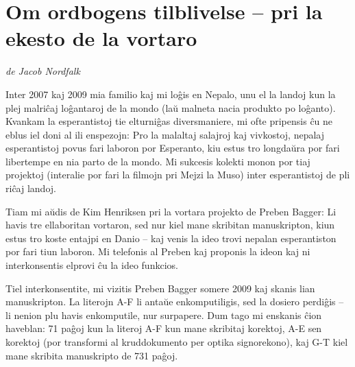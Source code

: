 \setlength{\textheight}{7.0in}
\setlength{\parskip}{1.5ex plus 0.2ex minus 0.2ex}
\setlength{\parindent}{0cm}
\titlespacing{\section}{0pt}{10pt}{0pt}

\pagestyle{empty}

\mbox{}

\newpage

\pagestyle{plain}

\section{Om ordbogens tilblivelse -- pri la ekesto de la vortaro}
{\itshape
de Jacob Nordfalk}

{\frenchspacing
Inter 2007 kaj 2009 mia familio kaj mi lo\^gis en Nepalo, unu el la
landoj kun la plej malri\^caj lo\^gantaroj de la mondo (la\u{u} malneta
nacia produkto po lo\^ganto). Kvankam la esperantistoj tie elturni\^gas
diversmaniere, mi ofte pripensis \^cu ne eblus iel doni al ili
enspezojn: Pro la malaltaj salajroj kaj vivkostoj, nepalaj
esperantistoj povus fari laboron por Esperanto, kiu estus tro
longda\u{u}ra por fari libertempe en nia parto de la mondo. Mi sukcesis
kolekti monon por tiaj projektoj (interalie por fari la filmojn pri
Mejzi la Muso) inter esperantistoj de pli ri\^caj landoj.}

{\frenchspacing
Tiam mi a\u{u}dis de Kim Henriksen pri la vortara projekto de Preben
Bagger: Li havis tre ellaboritan vortaron, sed nur kiel mane skribitan
manuskripton, kiun estus tro koste entajpi en Danio -- kaj venis la
ideo trovi nepalan esperantiston por fari tiun laboron. Mi telefonis al
Preben kaj proponis la ideon kaj ni interkonsentis elprovi \^cu la ideo
funkcios.

Tiel interkonsentite, mi vizitis Preben Bagger somere 2009 kaj skanis
lian manuskripton. La literojn A-F li anta\u{u}e enkomputiligis, sed la
dosiero perdi\^gis -- li nenion plu havis enkomputile, nur surpapere.
Dum tago mi enskanis \^cion haveblan: 71 pa\^goj kun la literoj A-F kun
mane skribitaj korektoj, A-E sen korektoj (por transformi al
kruddokumento per optika signorekono), kaj G-T kiel mane skribita
manuskripto de 731 pa\^goj. }

